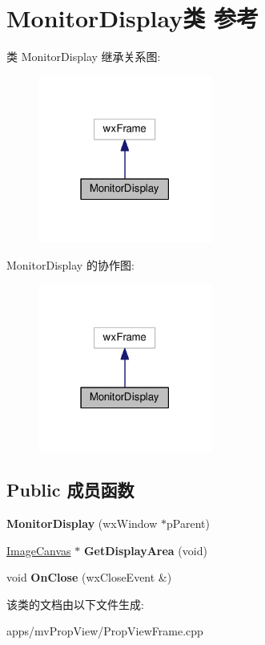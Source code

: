 \hypertarget{class_monitor_display}{\section{Monitor\+Display类 参考}
\label{class_monitor_display}
}


类 Monitor\+Display 继承关系图\+:
\nopagebreak
\begin{figure}[H]
\begin{center}
\leavevmode
\includegraphics[width=162pt]{class_monitor_display__inherit__graph}
\end{center}
\end{figure}


Monitor\+Display 的协作图\+:
\nopagebreak
\begin{figure}[H]
\begin{center}
\leavevmode
\includegraphics[width=162pt]{class_monitor_display__coll__graph}
\end{center}
\end{figure}
\subsection*{Public 成员函数}
\begin{DoxyCompactItemize}
\item 
\hypertarget{class_monitor_display_a671a28c7213b2c50632bdaaea4395dac}{{\bfseries Monitor\+Display} (wx\+Window $\ast$p\+Parent)}\label{class_monitor_display_a671a28c7213b2c50632bdaaea4395dac}

\item 
\hypertarget{class_monitor_display_ab9db75fd5964c8d22d744c28925e80ad}{\hyperlink{class_image_canvas}{Image\+Canvas} $\ast$ {\bfseries Get\+Display\+Area} (void)}\label{class_monitor_display_ab9db75fd5964c8d22d744c28925e80ad}

\item 
\hypertarget{class_monitor_display_a27d09ef66fff46a6e5c450a8e4e70abd}{void {\bfseries On\+Close} (wx\+Close\+Event \&)}\label{class_monitor_display_a27d09ef66fff46a6e5c450a8e4e70abd}

\end{DoxyCompactItemize}


该类的文档由以下文件生成\+:\begin{DoxyCompactItemize}
\item 
apps/mv\+Prop\+View/Prop\+View\+Frame.\+cpp\end{DoxyCompactItemize}
